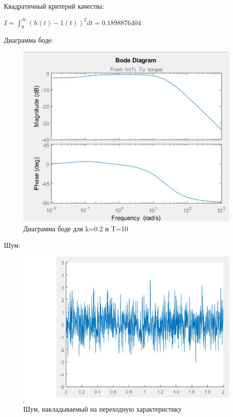 \documentclass[14pt,a4paper,report]{report}
\begin{document}
	Квадратичный критерий качества:
	
	\begin{center}
		$I=\int_{0}^{\infty}(h(t)-1(t))^2dt=0.1898876404$
	\end{center}
	
	\clearpage
	
	Диаграмма боде:
	
	\begin{figure}[h!]
		\centering
		\includegraphics[scale = 0.53]{images/bode10.jpg}
		\caption{Диаграмма боде для k=0.2 и T=10}
		\label{image:2}
	\end{figure}
	
	Шум:
	
	\begin{figure}[h!]
		\centering
		\includegraphics[scale = 0.53]{images/noice.jpg}
		\caption{Шум, накладываемый на переходную характеристику}
		\label{image:3}
	\end{figure}
	
\end{document}

